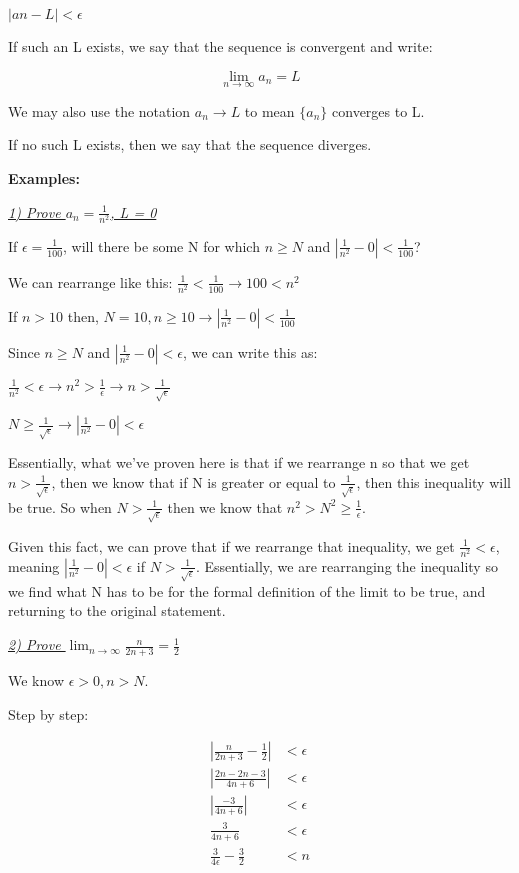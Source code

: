 \documentclass[11pt]{article}
\begin{document}
\begin{center}
    $|an - L| < \epsilon$
\end{center}

If such an L exists, we say that the sequence is convergent and write:

\begin{center}
    $$\lim_{n\to\infty} a_n = L$$
\end{center}

We may also use the notation $a_n \rightarrow L$ to mean $\{a_n\}$ converges to L.

If no such L exists, then we say that the sequence diverges.

\bigskip

\textbf{Examples: }

\textit{\underline{1) Prove $a_n=\frac{1}{n^2}$, L = 0}}
\smallskip

If $\epsilon = \frac{1}{100}$, will there be some N for which $n \geq N$ and $|
\frac{1}{n^2} - 0| < \frac{1}{100}$?
\medskip

We can rearrange like this: $\frac{1}{n^2} < \frac{1}{100} \rightarrow 100 < n^2$

If $n > 10$ then, $N = 10, n \geq 10 \rightarrow |\frac{1}{n^2} - 0| < \frac{1}{100}$

Since $n \geq N$ and $|\frac{1}{n^2} - 0| < \epsilon$, we can write this as:

$\frac{1}{n^2} < \epsilon \rightarrow n^2 > \frac{1}{\epsilon} \rightarrow n > \frac{1}{\sqrt{\epsilon}}$

$N \geq \frac{1}{\sqrt{\epsilon}} \rightarrow |\frac{1}{n^2} - 0| < \epsilon$
\medskip

Essentially, what we've proven here is that if we rearrange n so that we get $n > \frac{1}{\sqrt{\epsilon}}$, then we know that if N is greater or equal to $\frac{1}{\sqrt{\epsilon}}$, then this inequality will be true. So when $N > \frac{1}{\sqrt{\epsilon}}$ then we know that $n^2 > N^2 \geq \frac{1}{\epsilon}$. 

Given this fact, we can prove that if we rearrange that inequality, we get $\frac{1}{n^2} < \epsilon$, meaning $|\frac{1}{n^2} - 0| < \epsilon$ if $N > \frac{1}{\sqrt{\epsilon}}$. Essentially, we are rearranging the inequality so we find what N has to be for the formal definition of the limit to be true, and  returning to the original statement.
\medskip

\textit{\underline{2) Prove $\lim_{n\to\infty} \frac{n}{2n+3} = \frac{1}{2}$}}
\smallskip

We know $\epsilon > 0, n > N$.

Step by step:

\begin{align}
    |\frac{n}{2n+3} - \frac{1}{2}| &< \epsilon\\
    |\frac{2n-2n-3}{4n+6}| &< \epsilon\\
    |\frac{-3}{4n+6}| &< \epsilon\\
    \frac{3}{4n+6} &< \epsilon\\
    \frac{3}{4\epsilon} - \frac{3}{2} &< n\\
\end{align}
\end{document}
